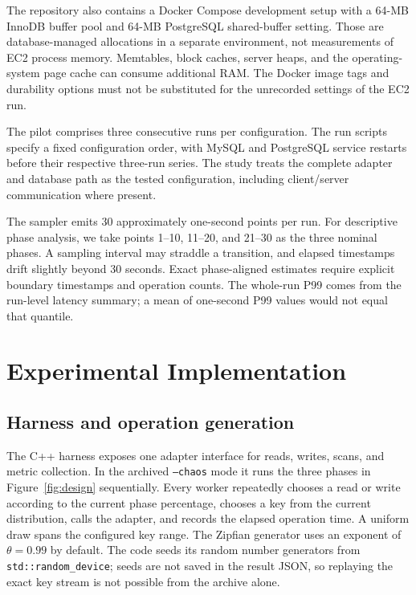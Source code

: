 \documentclass[10pt]{article}
\begin{document}
The repository also contains a Docker Compose development setup with a 64-MB InnoDB buffer pool and 64-MB PostgreSQL shared-buffer setting. Those are database-managed allocations in a separate environment, not measurements of EC2 process memory. Memtables, block caches, server heaps, and the operating-system page cache can consume additional RAM. The Docker image tags and durability options must not be substituted for the unrecorded settings of the EC2 run.

The pilot comprises three consecutive runs per configuration. The run scripts specify a fixed configuration order, with MySQL and PostgreSQL service restarts before their respective three-run series. The study treats the complete adapter and database path as the tested configuration, including client/server communication where present.



The sampler emits 30 approximately one-second points per run. For descriptive phase analysis, we take points 1--10, 11--20, and 21--30 as the three nominal phases. A sampling interval may straddle a transition, and elapsed timestamps drift slightly beyond 30 seconds. Exact phase-aligned estimates require explicit boundary timestamps and operation counts. The whole-run P99 comes from the run-level latency summary; a mean of one-second P99 values would not equal that quantile.

\section{Experimental Implementation}
\label{sec:implementation}
\subsection{Harness and operation generation}
The C++ harness exposes one adapter interface for reads, writes, scans, and metric collection. In the archived \texttt{--chaos} mode it runs the three phases in Figure~\ref{fig:design} sequentially. Every worker repeatedly chooses a read or write according to the current phase percentage, chooses a key from the current distribution, calls the adapter, and records the elapsed operation time. A uniform draw spans the configured key range. The Zipfian generator uses an exponent of $\theta=0.99$ by default. The code seeds its random number generators from \texttt{std::random\_device}; seeds are not saved in the result JSON, so replaying the exact key stream is not possible from the archive alone.
\end{document}
